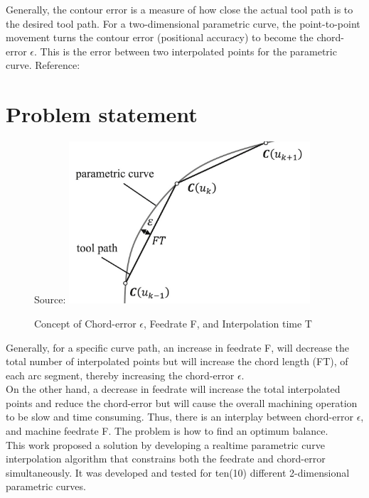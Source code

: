Generally, the contour error is a measure of how close the actual tool path is to the desired tool path. For a two-dimensional parametric curve, the point-to-point movement turns the contour error (positional accuracy) to become the chord-error $\epsilon$. This is the error between two interpolated points for the parametric curve. Reference: \cite{Sun-etal:2018}

\section{Problem statement}

\begin{figure}
	\caption{Concept of Chord-error $\epsilon$, Feedrate F, and Interpolation time T } Source: \cite{Nguyen-etal:2017}
	\label{chap1-Chord-error-image.png}
	\centering
	\includegraphics[width=0.80\textwidth]{Images/Chap3/Chord-error-image.png} 
\end{figure}


Generally, for a specific curve path, an increase in feedrate F, will decrease the total number of interpolated points but will increase the chord length (FT), of each arc segment, thereby increasing the chord-error $\epsilon$. \\

On the other hand, a decrease in feedrate will increase the total interpolated points and reduce the chord-error but will cause the overall machining operation to be slow and time consuming. Thus, there is an interplay between chord-error $\epsilon$, and machine feedrate F. The problem is how to find an optimum balance. \\

This work proposed a solution by developing a realtime parametric curve interpolation algorithm that constrains both the feedrate and chord-error simultaneously. It was developed and tested for ten(10) different 2-dimensional parametric curves. \\ 

